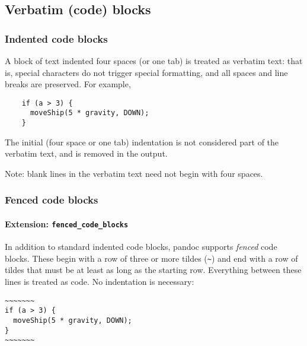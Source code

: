 \documentclass[
]{article}
\begin{document}
\hypertarget{verbatim-code-blocks}{%
\subsection{Verbatim (code) blocks}\label{verbatim-code-blocks}}

\hypertarget{indented-code-blocks}{%
\subsubsection{Indented code blocks}\label{indented-code-blocks}}

A block of text indented four spaces (or one tab) is treated as verbatim
text: that is, special characters do not trigger special formatting, and
all spaces and line breaks are preserved. For example,

\begin{verbatim}
    if (a > 3) {
      moveShip(5 * gravity, DOWN);
    }
\end{verbatim}

The initial (four space or one tab) indentation is not considered part
of the verbatim text, and is removed in the output.

Note: blank lines in the verbatim text need not begin with four spaces.

\hypertarget{fenced-code-blocks}{%
\subsubsection{Fenced code blocks}\label{fenced-code-blocks}}

\hypertarget{extension-fenced_code_blocks}{%
\paragraph{\texorpdfstring{Extension:
\texttt{fenced\_code\_blocks}}{Extension: fenced\_code\_blocks}}\label{extension-fenced_code_blocks}}

In addition to standard indented code blocks, pandoc supports
\emph{fenced} code blocks. These begin with a row of three or more
tildes (\texttt{\textasciitilde{}}) and end with a row of tildes that
must be at least as long as the starting row. Everything between these
lines is treated as code. No indentation is necessary:

\begin{verbatim}
~~~~~~~
if (a > 3) {
  moveShip(5 * gravity, DOWN);
}
~~~~~~~
\end{verbatim}
\end{document}
